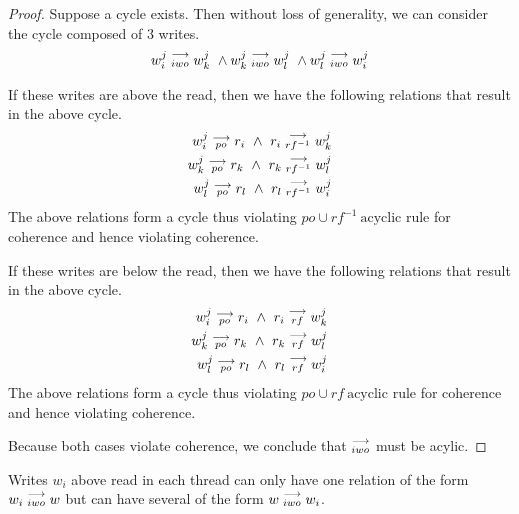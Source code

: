     \begin{proof}
        Suppose a cycle exists. Then without loss of generality, we can consider the cycle composed of 3 writes.
        \begin{align}
            \reln{w_i^j}{iwo}{w_k^j} \ \wedge \reln{w_k^j}{iwo}{w_l^j} \ \wedge \reln{w_l^j}{iwo}{w_i^j}  
        \end{align}
        
        If these writes are above the read, then we have the following relations that result in the above cycle.
        \begin{align}
            w_i^j\stackrel{\longrightarrow}{_{po}}r_i \ \wedge \ r_i\stackrel{\longrightarrow}{_{rf^{-1}}}w_k^j \\
            w_k^j\stackrel{\longrightarrow}{_{po}}r_k \ \wedge \ r_k\stackrel{\longrightarrow}{_{rf^{-1}}}w_l^j \\
            w_l^j\stackrel{\longrightarrow}{_{po}}r_l \ \wedge \ r_l\stackrel{\longrightarrow}{_{rf^{-1}}}w_i^j 
        \end{align}
        The above relations form a cycle thus violating $po \cup rf^{-1} \ \text{acyclic}$ rule for coherence and hence violating coherence.
        
        If these writes are below the read, then we have the following relations that result in the above cycle.
        \begin{align}
            w_i^j\stackrel{\longrightarrow}{_{po}}r_i \ \wedge \ r_i\stackrel{\longrightarrow}{_{rf}}w_k^j \\
            w_k^j\stackrel{\longrightarrow}{_{po}}r_k \ \wedge \ r_k\stackrel{\longrightarrow}{_{rf}}w_l^j \\
            w_l^j\stackrel{\longrightarrow}{_{po}}r_l \ \wedge \ r_l\stackrel{\longrightarrow}{_{rf}}w_i^j 
        \end{align}
        The above relations form a cycle thus violating $po \cup rf \ \text{acyclic}$ rule for coherence and hence violating coherence.

        Because both cases violate coherence, we conclude that $\stackrel{\longrightarrow}{_{iwo}}$ must be acylic. 

    \end{proof}


    \begin{property}
        Writes $w_i$ above read in each thread can only have one relation of the form $w_i\stackrel{\longrightarrow}{_{iwo}}w$ but can have several of the form $w\stackrel{\longrightarrow}{_{iwo}}w_i$. 
    \end{property}

